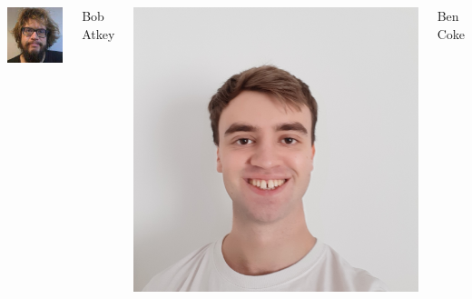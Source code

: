 \documentclass[t,compress,aspectratio=169]{beamer}
\begin{document}
\begin{frame}
\begin{columns}
    \includegraphics[width=\picwidth]{img/Bob.jpeg}
    \begin{block}
    {\centering\footnotesize{Bob Atkey}}
    \end{block}
  
    \includegraphics[width=\picwidth]{img/Ben.jpg}
   	\begin{block}
   	{\centering\footnotesize{Ben Coke}}
    \end{block}

   	\centering
  	\vspace{-1em}
   	

\end{columns}
\end{frame}
\end{document}
